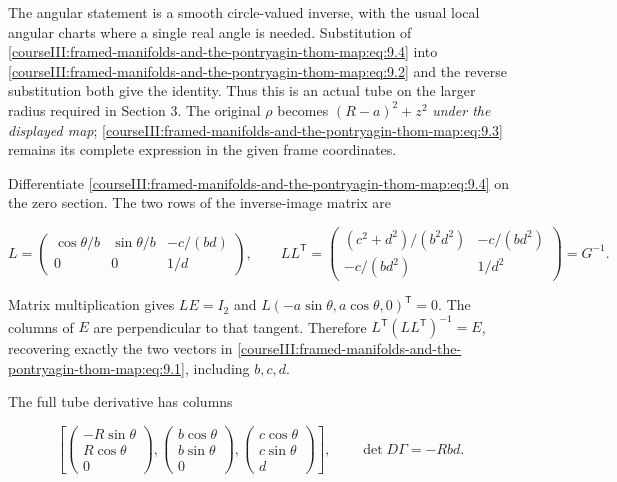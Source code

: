 The angular statement is a smooth circle-valued inverse, with the usual local angular charts where a single real angle is needed. Substitution of \eqref{courseIII:framed-manifolds-and-the-pontryagin-thom-map:eq:9.4} into \eqref{courseIII:framed-manifolds-and-the-pontryagin-thom-map:eq:9.2} and the reverse substitution both give the identity. Thus this is an actual tube on the larger radius required in Section 3. The original \(\rho\) becomes \((R-a)^2+z^2\) \emph{under the displayed map}; \eqref{courseIII:framed-manifolds-and-the-pontryagin-thom-map:eq:9.3} remains its complete expression in the given frame coordinates.

Differentiate \eqref{courseIII:framed-manifolds-and-the-pontryagin-thom-map:eq:9.4} on the zero section. The two rows of the inverse-image matrix are

\begin{equation}
L=
 \begin{pmatrix}
  \cos\theta/b&\sin\theta/b&-c/(bd)\\
  0&0&1/d
 \end{pmatrix},
 \qquad
 LL^{\mathsf T}=
 \begin{pmatrix}
 (c^2+d^2)/(b^2d^2)&-c/(bd^2)\\
 -c/(bd^2)&1/d^2
 \end{pmatrix}=G^{-1}.
 \label{courseIII:framed-manifolds-and-the-pontryagin-thom-map:eq:9.5}
\end{equation}

Matrix multiplication gives \(LE=I_2\) and
\(L(-a\sin\theta,a\cos\theta,0)^{\mathsf T}=0\). The columns of \(E\) are perpendicular to that tangent. Therefore \(L^{\mathsf T}(LL^{\mathsf T})^{-1}=E\), recovering exactly the two vectors in \eqref{courseIII:framed-manifolds-and-the-pontryagin-thom-map:eq:9.1}, including \(b,c,d\).

The full tube derivative has columns

\begin{equation}
\left[
 \begin{pmatrix}-R\sin\theta\\R\cos\theta\\0\end{pmatrix},
 \begin{pmatrix}b\cos\theta\\b\sin\theta\\0\end{pmatrix},
 \begin{pmatrix}c\cos\theta\\c\sin\theta\\d\end{pmatrix}
 \right],
 \qquad \det D\Gamma=-Rbd.
 \label{courseIII:framed-manifolds-and-the-pontryagin-thom-map:eq:9.6}
\end{equation}

